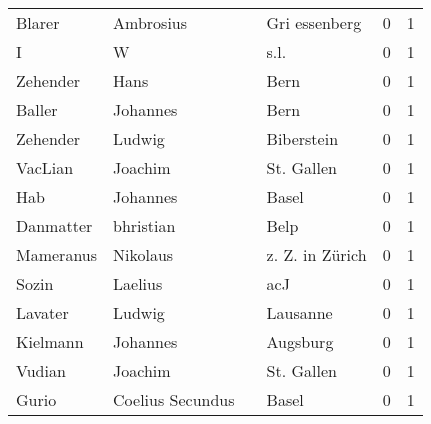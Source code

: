 \begin{center}
\begin{tiny}
\begin{longtabu}{llllrr}
                   Blarer &                          Ambrosius &             &                               Gri essenberg &          0 &         1 \\
                        I &                                  W &             &                                        s.l. &          0 &         1 \\
                 Zehender &                               Hans &             &                                        Bern &          0 &         1 \\
                   Baller &                           Johannes &             &                                        Bern &          0 &         1 \\
                 Zehender &                             Ludwig &             &                                  Biberstein &          0 &         1 \\
                  VacLian &                            Joachim &             &                                  St. Gallen &          0 &         1 \\
                      Hab &                           Johannes &             &                                       Basel &          0 &         1 \\
                Danmatter &                          bhristian &             &                                        Belp &          0 &         1 \\
                Mameranus &                           Nikolaus &             &                             z. Z. in Zürich &          0 &         1 \\
                    Sozin &                            Laelius &             &                                         acJ &          0 &         1 \\
                  Lavater &                             Ludwig &             &                                    Lausanne &          0 &         1 \\
                 Kielmann &                           Johannes &             &                                    Augsburg &          0 &         1 \\
                   Vudian &                            Joachim &             &                                  St. Gallen &          0 &         1 \\
                    Gurio &                   Coelius Secundus &             &                                       Basel &          0 &         1 \\

\end{longtabu}
\end{tiny}
\end{center}
